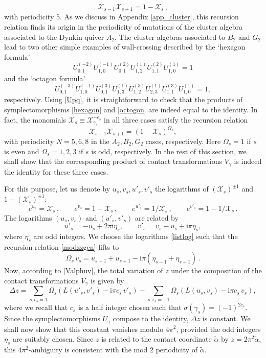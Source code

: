 \documentclass[12pt,reqno]{article}
\numberwithin{equation}{section}
\newcommand{\be}{\begin{equation}}
\newcommand{\ee}{\end{equation}}
\def\eps{\varepsilon}
\newcommand{\I}{\mathrm{i}}
\newcommand{\cX}{\mathcal{X}}
\def\talp{\tilde\alpha}
\def\eps{\epsilon}
\def\zz{\cX}
\def\ind{s}
\numberwithin{equation}{section}
\begin{document}
\be
\label{modzz}
\zz_{\ind-1} \zz_{\ind+1}= 1-\zz_\ind\, ,
\ee
with periodicity 5. As we discuss in Appendix \ref{app_cluster}, this recursion relation
finds its origin in the periodicity of  mutations of the cluster algebra associated to the
Dynkin quiver $A_2$. The cluster algebras associated to $B_2$ and $G_2$ lead to
two other simple examples of wall-crossing described by the `hexagon formula'
\be
\label{hexagon}
U_{0,1}^{(-2)} U_{1,0}^{(-1)}  U_{0,1}^{(2)} U_{1,2}^{(1)} U_{1,1}^{(2)} U_{1,0}^{(1)} = 1
\ee
and the `octagon formula'
\be
\label{octogon}
U_{0,1}^{(-3)}  U_{1,0}^{(-1)}  U_{0,1}^{(3)}
U_{1,3}^{(1)} U_{1,2}^{(3)} U_{2,3}^{(1)} U_{1,1}^{(3)} U_{1,0}^{(1)} = 1 ,
\ee
respectively. Using \eqref{Upq}, it is straightforward to check that the products of symplectomorphisms
\eqref{hexagon} and \eqref{octogon} are indeed equal to the identity. In fact,
the monomials $\zz_\ind\equiv \zz_{\gamma_\ind}^{-\eps_\ind}$ in all
 three cases satisfy the recursion relation
 \be
\label{modzzgen}
\zz_{\ind-1} \zz_{\ind+1}= (1-\zz_\ind)^{\Omega_s} ,
\ee
with periodicity $N=5,6,8$ in the $A_2,B_2,G_2$ cases, respectively.
Here $\Omega_\ind=1$ if $\ind$ is even and $\Omega_\ind=1,2,3$ if $\ind$ is odd,
respectively. In the rest of this section, we shall show that the corresponding
product of contact transformations $V_\gamma$ is indeed the identity for these
three cases.


For this purpose, let us denote by $u_\ind, v_\ind, u'_\ind, v'_\ind$ the
logarithms of $(\zz_\ind)^{\pm 1}$ and $1-(\zz_\ind)^{\pm 1}$:
\be
\label{listlog}
e^{u_\ind}=\zz_\ind\, ,
\qquad
e^{v_\ind}=1-\zz_\ind\, ,
\qquad
e^{u'_\ind}=1/\zz_\ind\, ,
\qquad
e^{v'_\ind}=1-1/\zz_\ind\, .
\ee
The logarithms $(u_\ind, v_\ind)$ and $(u'_\ind, v'_\ind)$ are related by
\be
u'_\ind=-u_\ind+2\pi\I\eta_\ind,
\qquad
v'_\ind=v_\ind-u_\ind+\I\pi\eta_\ind,
\ee
where $\eta_\ind$ are odd integers. We choose the logarithms \eqref{listlog} such that
the recursion relation \eqref{modzzgen} lifts to
\be
\label{recurvu2}
\Omega_\ind\, v_\ind = u_{\ind-1} + u_{\ind+1}-\I\pi(\eta_{\ind-1} + \eta_{\ind+1})\, .
\ee
Now, according to \eqref{Valphuv}, the total variation of $z$ under the composition
of the contact transformations $V_\gamma$ is given by
\be
\label{delz4}
\Delta z = \sum_{s: \eps_s=1}
\Omega_s \left(L(u'_s,v'_s) - {\I\pi} c_s \, v'_s\right)
-  \sum_{s: \eps_s=-1}
\Omega_s\left(L(u_s,v_s)  - {\I\pi} c_s \, v_s\right) ,
\ee
where we recall that $c_s$ is a half integer chosen such that $\sigma(\gamma_s)=(-1)^{2 c_s}$.
Since the symplectomorphisms $U_\gamma$ compose to the identity, $\Delta z$
is constant. We shall now show that this constant vanishes modulo $4\pi^2$, provided
the  odd integers $\eta_\ind$ are suitably chosen. Since $z$ is related to the contact
coordinate $\talp$ by $z=2\pi^2\talp$, this $4\pi^2$-ambiguity is consistent with the
mod 2 periodicity of $\talp$.
\end{document}
